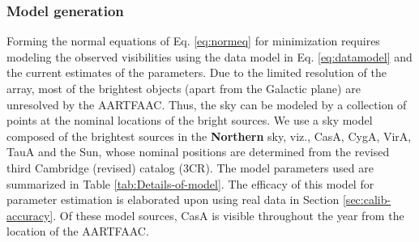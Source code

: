 \documentclass{aa}
\begin{document}
\subsubsection{\label{sub:Model-generation}Model generation}
\begin{table}[tbh]
\caption{Details of model sources (the A-team) used for All-sky self-calibration}
\label{tab:Details-of-model}
\end{table}

Forming the  normal equations of  Eq. \ref{eq:normeq} for  minimization requires
modeling    the    observed   visibilities    using    the    data   model    in
Eq. \ref{eq:datamodel} and the current  estimates of the parameters.  Due to the
limited resolution of  the array, most of the brightest  objects (apart from the
Galactic plane) are unresolved by the AARTFAAC.  Thus, the sky can be modeled by
a collection of points at the nominal  locations of the bright sources. We use a
sky model composed of the  brightest sources in the \textbf{Northern} sky, viz.,
CasA, CygA, VirA, TauA and the  Sun, whose nominal positions are determined from
the revised third Cambridge (revised)  catalog (3CR).  The model parameters used
are summarized in Table  \ref{tab:Details-of-model}.  The efficacy of this model
for  parameter  estimation  is  elaborated  upon  using  real  data  in  Section
\ref{sec:calib-accuracy}.  Of  these model  sources, CasA is  visible throughout
the year from the location of the AARTFAAC.
\end{document}
